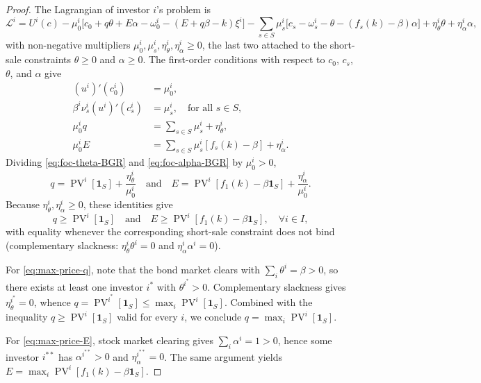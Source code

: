 \documentclass[11pt,a4paper,oneside]{book}
\def\1{\mathbf{1}}
\def\leq{\leqslant}
\def\geq{\geqslant}
\def\et{\quad \text{and} \quad}
\DeclareMathOperator{\PV}{PV}
\theoremstyle{plain}
\theoremstyle{definition}
\theoremstyle{remark}
\numberwithin{equation}{chapter}
\begin{document}
\begin{proof}
The Lagrangian of investor $i$'s problem is
\begin{equation*}
  \mathcal{L}^i = U^i(c) - \mu^i_0 \bigl[c_0 + q \theta + E \alpha - \omega^i_0 - (E + q \beta - k) \xi^i\bigr]
  - \sum_{s \in S} \mu^i_s \bigl[c_s - \omega^i_s - \theta - (f_s(k) - \beta) \alpha\bigr]
  + \eta^i_\theta \theta + \eta^i_\alpha \alpha,
\end{equation*}
with non-negative multipliers $\mu^i_0, \mu^i_s, \eta^i_\theta, \eta^i_\alpha \geq 0$, the last two attached to the short-sale constraints $\theta \geq 0$ and $\alpha \geq 0$.
The first-order conditions with respect to $c_0$, $c_s$, $\theta$, and $\alpha$ give
\begin{align}
  (u^i)'(c^i_0) &= \mu^i_0,
  \label{eq:foc-c0-BGR}\\
  \beta^i \nu^i_s (u^i)'(c^i_s) &= \mu^i_s, \quad \text{for all $s\in S$},
  \label{eq:foc-cs-BGR}\\
  \mu^i_0 q &= \sum_{s \in S} \mu^i_s + \eta^i_\theta,
  \label{eq:foc-theta-BGR}\\
  \mu^i_0 E &= \sum_{s \in S} \mu^i_s [f_s(k) - \beta] + \eta^i_\alpha.
  \label{eq:foc-alpha-BGR}
\end{align}
Dividing \eqref{eq:foc-theta-BGR} and \eqref{eq:foc-alpha-BGR} by $\mu^i_0 > 0$,
\begin{equation}\label{eq:FOC-inequalities}
  q = \PV^i[\1_S] + \frac{\eta^i_\theta}{\mu^i_0}
  \et
  E = \PV^i[f_1(k) - \beta \1_S] + \frac{\eta^i_\alpha}{\mu^i_0}.
\end{equation}
Because $\eta^i_\theta, \eta^i_\alpha \geq 0$, these identities give
\begin{equation*}
  q \geq \PV^i[\1_S]
  \et
  E \geq \PV^i[f_1(k) - \beta \1_S],
  \quad \forall i \in I,
\end{equation*}
with equality whenever the corresponding short-sale constraint does not bind (complementary slackness: $\eta^i_\theta \theta^i = 0$ and $\eta^i_\alpha \alpha^i = 0$).

For \eqref{eq:max-price-q}, note that the bond market clears with $\sum_i \theta^i = \beta > 0$, so there exists at least one investor $i^\ast$ with $\theta^{i^\ast} > 0$.
Complementary slackness gives $\eta^{i^\ast}_\theta = 0$, whence $q = \PV^{i^\ast}[\1_S] \leq \max_i \PV^i[\1_S]$.
Combined with the inequality $q \geq \PV^i[\1_S]$ valid for every $i$, we conclude $q = \max_i \PV^i[\1_S]$.

For \eqref{eq:max-price-E}, stock market clearing gives $\sum_i \alpha^i = 1 > 0$, hence some investor $i^{\ast\ast}$ has $\alpha^{i^{\ast\ast}} > 0$ and $\eta^{i^{\ast\ast}}_\alpha = 0$.
The same argument yields $E = \max_i \PV^i[f_1(k) - \beta \1_S]$.
\end{proof}
\end{document}
